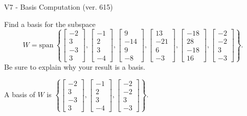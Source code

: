 \begin{exercise}
  \begin{exerciseTitle}V7 - Basis Computation (ver. 615)\end{exerciseTitle}
  \begin{exerciseStatement}
    Find a basis for the subspace 
\[W=\mathrm{span}\ \left\{\left[\begin{array}{r}
-2 \\
3 \\
-3 \\
3
\end{array}\right] , \left[\begin{array}{r}
-1 \\
2 \\
3 \\
-4
\end{array}\right] , \left[\begin{array}{r}
9 \\
-14 \\
9 \\
-8
\end{array}\right] , \left[\begin{array}{r}
13 \\
-21 \\
6 \\
-3
\end{array}\right] , \left[\begin{array}{r}
-18 \\
28 \\
-18 \\
16
\end{array}\right] , \left[\begin{array}{r}
-2 \\
-2 \\
3 \\
-3
\end{array}\right]\right\}.\]
 Be sure to explain why your result is a basis.


  \end{exerciseStatement}
  \begin{exerciseAnswer}
   A basis of \(W\) is  \(\left\{\left[\begin{array}{r}
-2 \\
3 \\
-3 \\
3
\end{array}\right] , \left[\begin{array}{r}
-1 \\
2 \\
3 \\
-4
\end{array}\right] , \left[\begin{array}{r}
-2 \\
-2 \\
3 \\
-3
\end{array}\right]\right\}\).
  


  \end{exerciseAnswer}
\end{exercise}